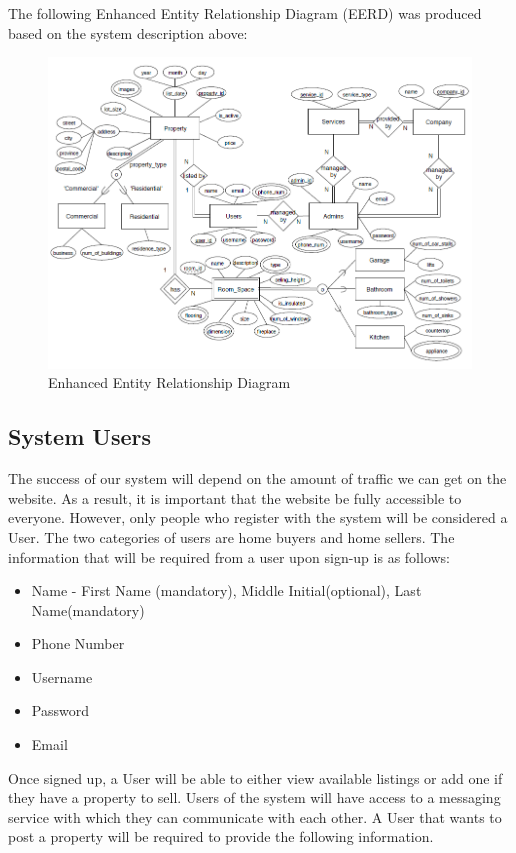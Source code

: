 \documentclass[12pt,a4paper]{report}
\begin{document}
The following Enhanced Entity Relationship Diagram (EERD) was produced based on the system description above:

\begin{figure}[H]
\centering
\includegraphics[scale=1.0]{EERD.png}
\caption{Enhanced Entity Relationship Diagram}
\label{Figure:EERD}
\end{figure}   

\subsection{System Users}
The success of our system will depend on the amount of traffic we can get on the website. As a result, it is important that the website be fully accessible to everyone. However, only people who register with the system will be considered a User. The two categories of users are home buyers and home sellers. The information that will be required from a user upon sign-up is as follows:  

\begin{itemize} 
\item Name - First Name (mandatory), Middle Initial(optional), Last Name(mandatory)
\item Phone Number 
\item Username
\item Password
\item Email
\end{itemize}

Once signed up, a User will be able to either view available listings or add one if they have a property to sell. Users of the system will have access to a messaging service with which they can communicate with each other. A User that wants to post a property will be required to provide the following information.
\end{document}
